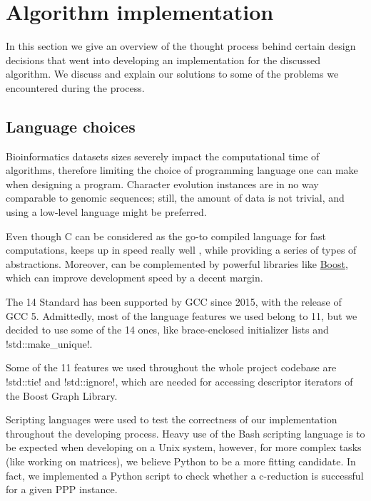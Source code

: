 
\section{Algorithm implementation}\label{section:implementation}

In this section we give an overview of the thought process behind certain design decisions that went into developing an implementation for the discussed algorithm.
We discuss and explain our solutions to some of the problems we encountered during the process.

\subsection{Language choices}\label{section:language-choices}

Bioinformatics datasets sizes severely impact the computational time of algorithms, therefore limiting the choice of programming language one can make when designing a program.
Character evolution instances are in no way comparable to genomic sequences; still, the amount of data is not trivial, and using a low-level language might be preferred.

Even though C can be considered as the go-to compiled language for fast computations, \cc{} keeps up in speed really well \cite{PLB2008}, while providing a series of types of abstractions.
Moreover, \cc{} can be complemented by powerful libraries like \href{http://www.boost.org/}{Boost}, which can improve development speed by a decent margin.

The \cc{}14 Standard has been supported by GCC since 2015, with the release of GCC 5.
Admittedly, most of the language features we used belong to \cc{}11, but we decided to use some of the \cc{}14 ones, like brace-enclosed initializer lists and !std::make_unique!.

Some of the \cc{}11 features we used throughout the whole project codebase are !std::tie! and !std::ignore!, which are needed for accessing descriptor iterators of the Boost Graph Library.

Scripting languages were used to test the correctness of our implementation throughout the developing process.
Heavy use of the Bash scripting language is to be expected when developing on a Unix system, however, for more complex tasks (like working on matrices), we believe Python to be a more fitting candidate.
In fact, we implemented a Python script to check whether a c-reduction is successful for a given PPP instance.


